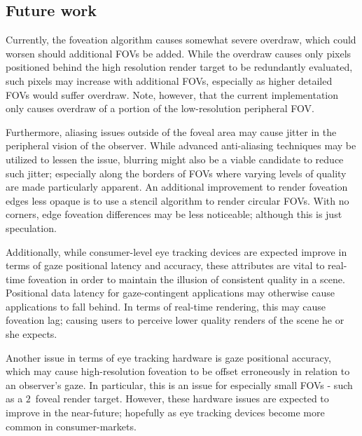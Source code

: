 \subsection{Future work}
Currently, the foveation algorithm causes somewhat severe overdraw, which could worsen should additional FOVs be added.
While the overdraw causes only pixels positioned behind the high resolution render target to be redundantly evaluated, such pixels may increase with additional FOVs, especially as higher detailed FOVs would suffer overdraw.
Note, however, that the current implementation only causes overdraw of a portion of the low-resolution peripheral FOV.

Furthermore, aliasing issues outside of the foveal area may cause jitter in the peripheral vision of the observer.
While advanced anti-aliasing techniques may be utilized to lessen the issue, blurring might also be a viable candidate to reduce such jitter; especially along the borders of FOVs where varying levels of quality are made particularly apparent.
An additional improvement to render foveation edges less opaque is to use a stencil algorithm to render circular FOVs.
With no corners, edge foveation differences may be less noticeable; although this is just speculation.

Additionally, while consumer-level eye tracking devices are expected improve in terms of gaze positional latency and accuracy, these attributes are vital to real-time foveation in order to maintain the illusion of consistent quality in a scene.
Positional data latency for gaze-contingent applications may otherwise cause applications to fall behind.
In terms of real-time rendering, this may cause foveation lag; causing users to perceive lower quality renders of the scene he or she expects.

Another issue in terms of eye tracking hardware is gaze positional accuracy, which may cause high-resolution foveation to be offset erroneously in relation to an observer's gaze.
In particular, this is an issue for especially small FOVs - such as a $2$\degree\ foveal render target.
However, these hardware issues are expected to improve in the near-future; hopefully as eye tracking devices become more common in consumer-markets.

